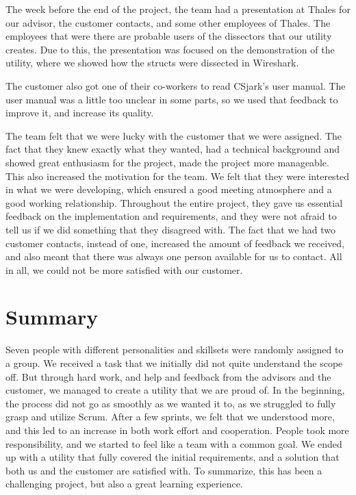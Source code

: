The week before the end of the project, the team had a presentation at Thales for our advisor, the customer contacts, and some other employees of Thales. The employees that were there are probable users of the dissectors that our utility creates. Due to this, the presentation was focused on the demonstration of the utility, where we showed how the structs were dissected in Wireshark.

The customer also got one of their co-workers to read CSjark's user manual.
The user manual was a little too unclear in some parts, so we used that feedback to improve it, and increase its quality.

The team felt that we were lucky with the customer that we were assigned.
The fact that they knew exactly what they wanted, had a technical background and showed great enthusiasm for the project, made the project more manageable. This also increased the motivation for the team. We felt that they were interested in what we were developing, which ensured a good meeting atmosphere and a good working relationship. Throughout the entire project, they gave us essential feedback on the implementation and requirements, and they were not afraid to tell us if we did something that they disagreed with. The fact that we had two customer contacts, instead of one, increased the amount of feedback we received, and also meant that there was always one person available for us to contact. All in all, we could not be more satisfied with our customer.


\section{Summary}
Seven people with different personalities and skillsets were randomly assigned to a group. We received a task that we initially did not quite understand the scope off.
But through hard work, and help and feedback from the advisors and the customer, we managed to create a utility that we are proud of. In the beginning, the process did not go as smoothly as we wanted it to, as we struggled to fully grasp and utilize Scrum. After a few sprints, we felt that we understood more, and this led to an increase in both work effort and cooperation. People took more responsibility, and we started to feel like a team with a common goal. We ended up with a utility that fully covered the initial requirements, and a solution that both us and the customer are satisfied with. To summarize, this has been a challenging project, but also a great learning experience.


